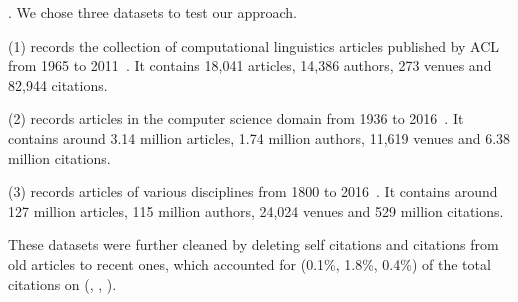 . We chose three datasets to test our approach.

\noindent
(1) \aan records the collection of computational linguistics articles published by ACL from 1965 to 2011~\cite{Liang16AAAI}.
It contains 18,041 articles, 14,386 authors, 273 venues and 82,944 citations.

\noindent
(2) \aminer records articles in the computer science domain from 1936 to 2016~\cite{Tang:08KDD}.
It contains around 3.14 million articles, 1.74 million authors, 11,619 venues and 6.38 million citations.

\noindent
(3) \magdata records articles of various disciplines from 1800 to 2016~\cite{Sinha15:MAG}.
It contains around 127 million articles, 115 million authors, 24,024 venues and 529 million citations.

These datasets were further cleaned by deleting self citations and citations from old articles to recent ones, which accounted for (0.1\%, 1.8\%, 0.4\%) of the total citations on (\aan, \aminer, \magdata).









